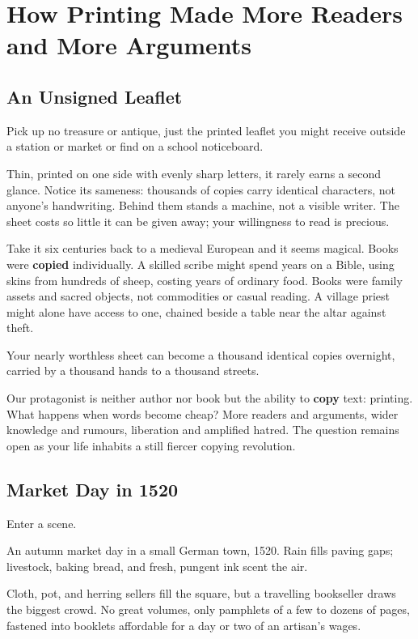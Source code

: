 \chapter[Printing, Readers and Arguments]{How Printing Made More Readers and More Arguments}
\section{An Unsigned Leaflet}
Pick up no treasure or antique, just the printed leaflet you might receive outside a station or market or find on a school noticeboard.

Thin, printed on one side with evenly sharp letters, it rarely earns a second glance. Notice its sameness: thousands of copies carry identical characters, not anyone's handwriting. Behind them stands a machine, not a visible writer. The sheet costs so little it can be given away; your willingness to read is precious.

Take it six centuries back to a medieval European and it seems magical. Books were \textbf{copied} individually. A skilled scribe might spend years on a Bible, using skins from hundreds of sheep, costing years of ordinary food. Books were family assets and sacred objects, not commodities or casual reading. A village priest might alone have access to one, chained beside a table near the altar against theft.

Your nearly worthless sheet can become a thousand identical copies overnight, carried by a thousand hands to a thousand streets.

Our protagonist is neither author nor book but the ability to \textbf{copy} text: printing. What happens when words become cheap? More readers and arguments, wider knowledge and rumours, liberation and amplified hatred. The question remains open as your life inhabits a still fiercer copying revolution.

\section{Market Day in 1520}
Enter a scene.

An autumn market day in a small German town, 1520. Rain fills paving gaps; livestock, baking bread, and fresh, pungent ink scent the air.

Cloth, pot, and herring sellers fill the square, but a travelling bookseller draws the biggest crowd. No great volumes, only pamphlets of a few to dozens of pages, fastened into booklets affordable for a day or two of an artisan's wages.

